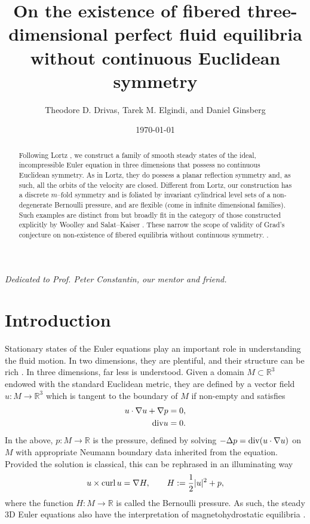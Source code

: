 \documentclass[11pt]{article}
\title{\vspace{-12mm}On the existence of fibered three-dimensional  perfect fluid equilibria without continuous Euclidean symmetry}
\author{Theodore D. Drivas, Tarek M. Elgindi, and Daniel Ginsberg}
\date{\today}
\theoremstyle{plain}
\numberwithin{equation}{section}
\theoremstyle{remark}
\renewcommand{\div}{{\rm div}}
\newcommand{\be}{\begin{equation}}
\newcommand{\ee}{\end{equation}}
\begin{document}
\maketitle


\vspace{-8mm}
\begin{abstract}
Following Lortz \cite{L70}, we construct a family of smooth steady states of the ideal, incompressible Euler equation in three dimensions that possess no continuous Euclidean symmetry.  As in Lortz, they do possess a planar reflection symmetry and, as such,  all the orbits of the velocity are closed.  Different from Lortz, our construction has a discrete $m$--fold symmetry and is foliated by invariant  cylindrical  level sets of a non-degenerate Bernoulli pressure, and are flexible (come in infinite dimensional families). Such examples are distinct from but broadly fit in the category of those constructed explicitly by Woolley \cite{W77} and Salat--Kaiser \cite{SK95,KS97}. These narrow the scope of validity of Grad's conjecture on non-existence of fibered equilibria without continuous symmetry. \cite{G1}. 
\end{abstract}



\begin{center}
\textit{Dedicated to Prof. Peter Constantin, our mentor and friend.}
\end{center}
\vspace{-4mm}

\section{Introduction}



Stationary states of the Euler equations play an important role in understanding the fluid motion.   In two dimensions, they are plentiful, and their structure can be rich \cite{DE23}. In three dimensions, far less is understood.  Given a domain $M\subset \mathbb{R}^3$  endowed with the standard Euclidean metric, they are defined by a vector field $u:M\to \mathbb{R}^3$ which is tangent to the boundary of $M$ if non-empty and satisfies
\begin{alignat}{2}
  \label{eul1}
  u\cdot \nabla u + \nabla p &=0, \\
  \label{eul2}
  \div u &=0.
\end{alignat}
In the above, $p:M\to \mathbb{R}$ is the pressure, defined by solving $-\Delta p = \div (u \cdot \nabla u)$ on $M$ with appropriate Neumann boundary data inherited from the equation. Provided the solution is  classical, this can be rephrased in an illuminating way
\be\label{Eulereqn}
u\times {\rm curl} \ \! u = \nabla H, \qquad H := \frac{1}{2} |u|^2+p,
\ee
 where the  function $H:M\to \mathbb{R}$ is called the Bernoulli pressure.  As such, the steady 3D Euler equations also have the interpretation of magnetohydrostatic equilibria \cite{G1, G2, G3, CDG21a}.
 
\end{document}
